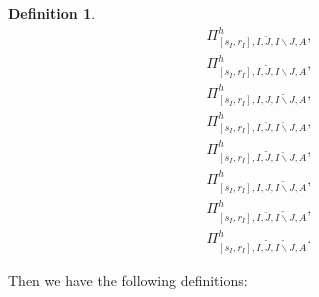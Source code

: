 \documentclass[12pt]{amsart}
\theoremstyle{definition}
\newtheorem{definition}[theorem]{Definition}
\numberwithin{equation}{section}
\begin{document}
\begin{definition}
\begin{align}
\Pi^h_{[s_I,r_I],I,\breve{J},I\backslash J,A},\\	
\Pi^h_{[s_I,r_I],I,\widetilde{J},I\backslash J,A},\\
\Pi^h_{[s_I,r_I],I,J,\breve{I\backslash J},A},\\	
\Pi^h_{[s_I,r_I],I,\breve{J},\breve{I\backslash J},A},\\	
\Pi^h_{[s_I,r_I],I,\widetilde{J},\breve{I\backslash J},A},\\
\Pi^h_{[s_I,r_I],I,J,\widetilde{I\backslash J},A},\\	
\Pi^h_{[s_I,r_I],I,\breve{J},\widetilde{I\backslash J},A},\\	
\Pi^h_{[s_I,r_I],I,\widetilde{J},\widetilde{I\backslash J},A}.
\end{align}
\end{definition}








\indent Then we have the following definitions:
\end{document}
